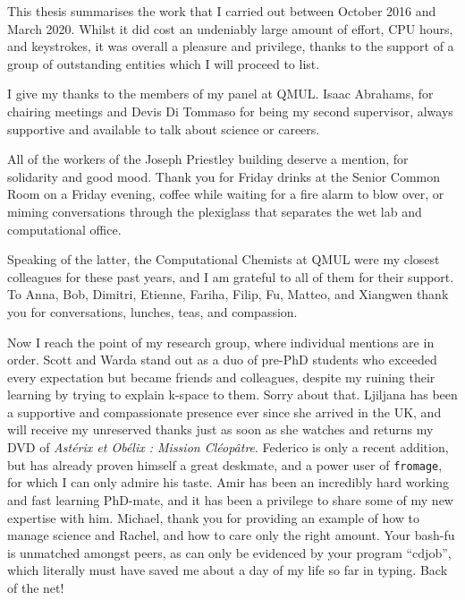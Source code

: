 \documentclass[
11pt, %
english, %
singlespacing, %
headsepline, %
]{MastersDoctoralThesis} %
\begin{document}

\begin{acknowledgements}
\addchaptertocentry{\acknowledgementname} %
This thesis summarises the work that I carried out between October 2016 and March 2020. Whilst it did cost an undeniably large amount of effort, CPU hours, and keystrokes, it was overall a pleasure and privilege, thanks to the support of a group of outstanding entities which I will proceed to list.

I give my thanks to the members of my panel at QMUL. Isaac Abrahams, for chairing meetings and Devis Di Tommaso for being my second supervisor, always supportive and available to talk about science or careers.

All of the workers of the Joseph Priestley building deserve a mention, for solidarity and good mood. Thank you for Friday drinks at the Senior Common Room on a Friday evening, coffee while waiting for a fire alarm to blow over, or miming conversations through the plexiglass that separates the wet lab and computational office.

Speaking of the latter, the Computational Chemists at QMUL were my closest colleagues for these past years, and I am grateful to all of them for their support. To Anna, Bob, Dimitri, Etienne, Fariha, Filip, Fu, Matteo, and Xiangwen thank you for conversations, lunches, teas, and compassion.

Now I reach the point of my research group, where individual mentions are in order. Scott and Warda stand out as a duo of pre-PhD students who exceeded every expectation but became friends and colleagues, despite my ruining their learning by trying to explain k-space to them. Sorry about that. Ljiljana has been a supportive and compassionate presence ever since she arrived in the UK, and will receive my unreserved thanks just as soon as she watches and returns my DVD of \textit{Ast\'erix et Obélix : Mission Cl\'eop\^atre}. Federico is only a recent addition, but has already proven himself a great deskmate, and a power user of \texttt{fromage}, for which I can only admire his taste. Amir has been an incredibly hard working and fast learning PhD-mate, and it has been a privilege to share some of my new expertise with him. Michael, thank you for providing an example of how to manage science and Rachel, and how to care only the right amount. Your bash-fu is unmatched amongst peers, as can only be evidenced by your program “cdjob”, which literally must have saved me about a day of my life so far in typing. Back of the net!


\end{acknowledgements}
\end{document}
